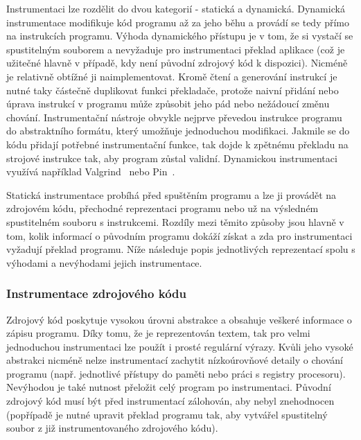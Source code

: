 Instrumentaci lze rozdělit do dvou kategorií - statická a dynamická. Dynamická instrumentace modifikuje kód programu až za jeho běhu a provádí se tedy přímo na instrukcích programu. Výhoda dynamického přístupu je v tom, že si vystačí se spustitelným souborem a nevyžaduje pro instrumentaci překlad aplikace (což je užitečné hlavně v případě, kdy není původní zdrojový kód k dispozici). Nicméně je relativně obtížné ji naimplementovat. Kromě čtení a generování instrukcí je nutné taky částečně duplikovat funkci překladače, protože naivní přidání nebo úprava instrukcí v programu může způsobit jeho pád nebo nežádoucí změnu chování. Instrumentační nástroje obvykle nejprve převedou instrukce programu do abstraktního formátu, který umožňuje jednoduchou modifikaci. Jakmile se do kódu přidají potřebné instrumentační funkce, tak dojde k zpětnému překladu na strojové instrukce tak, aby program zůstal validní.
Dynamickou instrumentaci využívá například Valgrind~\cite{valgrind} nebo Pin~\cite{pin}.

Statická instrumentace probíhá před spuštěním programu a lze ji provádět na zdrojovém kódu, přechodné reprezentaci programu nebo už na výsledném spustitelném souboru s instrukcemi. Rozdíly mezi těmito způsoby jsou hlavně v tom, kolik informací o původním programu dokáží získat a zda pro instrumentaci vyžadují překlad programu. Níže následuje popis jednotlivých reprezentací spolu s výhodami a nevýhodami jejich instrumentace.

\subsubsection*{Instrumentace zdrojového kódu}
Zdrojový kód poskytuje vysokou úrovni abstrakce a obsahuje veškeré informace o zápisu programu. Díky tomu, že je reprezentován textem, tak pro velmi jednoduchou instrumentaci lze použít i prosté regulární výrazy. Kvůli jeho vysoké abstrakci nicméně nelze instrumentací zachytit nízkoúrovňové detaily o chování programu (např. jednotlivé přístupy do paměti nebo práci s registry procesoru). Nevýhodou je také nutnost přeložit celý program po instrumentaci. Původní zdrojový kód musí být před instrumentací zálohován, aby nebyl znehodnocen (popřípadě je nutné upravit překlad programu tak, aby vytvářel spustitelný soubor z již instrumentovaného zdrojového kódu).

